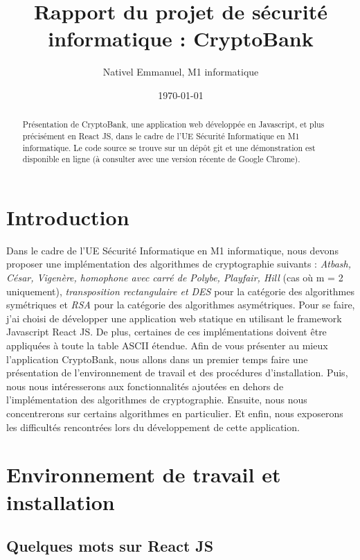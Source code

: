 \documentclass{article}
\title{Rapport du projet de sécurité informatique : CryptoBank}
\author{Nativel Emmanuel,  M1 informatique}
\date{\today}
\begin{document}
\maketitle %


\begin{abstract}
  Présentation de CryptoBank,  une application web développée en Javascript, et plus précisément en React JS, dans le cadre de l'UE Sécurité Informatique en M1 informatique. Le code source se trouve sur un dépôt git\cite{GitHub} et une démonstration est disponible en ligne\cite{site} (à consulter avec une version récente de Google Chrome).
\end{abstract}

\section{Introduction}
\label{section:introduction}

Dans le cadre de l'UE Sécurité Informatique en M1 informatique, nous devons proposer une implémentation des algorithmes de cryptographie suivants : \textit{Atbash, César, Vigenère, homophone avec carré de Polybe, Playfair, Hill} (cas où m = 2 uniquement), \textit{transposition rectangulaire et DES} pour la catégorie des algorithmes symétriques et \textit{RSA} pour la catégorie des algorithmes asymétriques. 
Pour se faire, j'ai choisi de développer une application web statique en utilisant le framework Javascript React JS\cite{react}. De plus, certaines de ces implémentations doivent être appliquées à toute la table ASCII étendue.
Afin de vous présenter au mieux l'application CryptoBank, nous allons dans un premier temps faire une présentation de l'environnement de travail et des procédures d'installation. Puis, nous nous intéresserons aux fonctionnalités ajoutées en dehors de l'implémentation des algorithmes de cryptographie. Ensuite, nous nous concentrerons sur certains algorithmes en particulier. Et enfin, nous exposerons les difficultés rencontrées lors du développement de cette application.

\section{Environnement de travail et installation}
\subsection{Quelques mots sur React JS}
\end{document}
